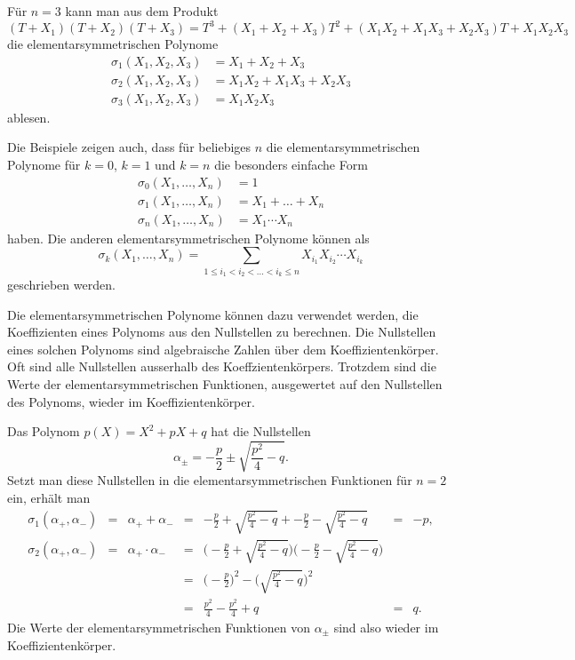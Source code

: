 \begin{beispiel}
Für $n=3$ 
kann man aus dem Produkt
\[
(T+X_1)
(T+X_2)
(T+X_3)
=
T^3
+
(X_1+X_2+X_3)T^2
+(X_1X_2+X_1X_3+X_2X_3)T
+
X_1X_2X_3
\]
die elementarsymmetrischen Polynome
\begin{equation}
\begin{aligned}
\sigma_1(X_1,X_2,X_3) &= X_1+X_2+X_3\\
\sigma_2(X_1,X_2,X_3) &= X_1X_2 + X_1X_3 + X_2X_3\\
\sigma_3(X_1,X_2,X_3) &= X_1X_2X_3
\end{aligned}
\label{buch:komplex:fundamental:bsp:elementar3}
\end{equation}
ablesen.
\end{beispiel}

Die Beispiele zeigen auch, dass für beliebiges $n$ die
elementarsymmetrischen Polynome für $k=0$, $k=1$ und 
$k=n$
die besonders einfache Form
\begin{align*}
\sigma_0(X_1,\dots,X_n) &= 1 \\
\sigma_1(X_1,\dots,X_n) &= X_1+\ldots + X_n \\
\sigma_n(X_1,\dots,X_n) &= X_1 \cdots X_n
\end{align*}
haben.
Die anderen elementarsymmetrischen Polynome können als
\[
\sigma_k(X_1,\dots,X_n)
=
\sum_{1\le i_1<i_2<\dots<i_k\le n}
X_{i_1}
X_{i_2}
\cdots
X_{i_k}
\]
geschrieben werden.

Die elementarsymmetrischen Polynome können dazu verwendet werden, die
Koeffizienten eines Polynoms aus den Nullstellen zu berechnen.
Die Nullstellen eines solchen Polynoms sind algebraische Zahlen über
dem Koeffizientenkörper.
Oft sind alle Nullstellen ausserhalb des Koeffzientenkörpers.
Trotzdem sind die Werte der elementarsymmetrischen Funktionen, ausgewertet
auf den Nullstellen des Polynoms, wieder im Koeffizientenkörper.

\begin{beispiel}
Das Polynom $p(X) = X^2+pX+q$ hat die Nullstellen
\[
\alpha_{\pm}
=
-\frac{p}{2}
\pm
\!
\sqrt{ \frac{p^2}{4}-q }.
\]
Setzt man diese Nullstellen in die elementarsymmetrischen Funktionen
für $n=2$ ein, erhält man
\[
\renewcommand{\arraycolsep}{1.5pt}
\begin{array}{rccclcl}
\sigma_1(\alpha_+,\alpha_-)
&=&
\alpha_++\alpha_-
&=&
\displaystyle
-\frac{p}{2}
+
\!\sqrt{ \frac{p^2}{4}-q }
+
-\frac{p}{2}
-
\!\sqrt{ \frac{p^2}{4}-q }
&=&
-p,
\\[7pt]
\sigma_2(\alpha_+,\alpha_-)
&=&
\alpha_+\cdot \alpha_-
&=&
\displaystyle
\biggl(
-\frac{p}{2}
+
\!\sqrt{ \frac{p^2}{4}-q }
\biggr)
\biggl(
-\frac{p}{2}
-
\!\sqrt{ \frac{p^2}{4}-q }
\biggr)
\\[7pt]
& &
&=&
\displaystyle
\biggl(-\frac{p}{2}\biggr)^2
-
\biggl(
\!\sqrt{ \frac{p^2}{4}-q }
\biggr)^2
\\[7pt]
& &
&=&
\displaystyle
\frac{p^2}{4}
-
\frac{p^2}{4}+q
&=&
q.
\end{array}
\]
Die Werte der elementarsymmetrischen Funktionen von $\alpha_{\pm}$ sind
also wieder im Koeffizientenkörper.
\end{beispiel}


